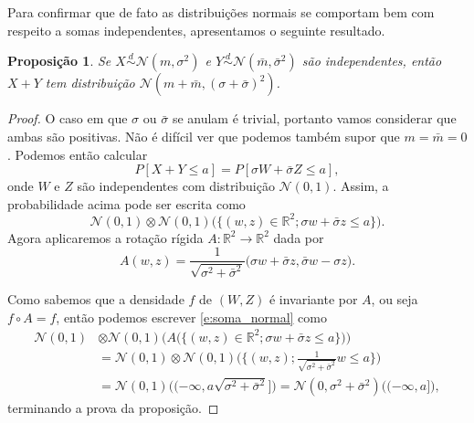 \documentclass[reqno]{article}
\newcommand*\1{\mathds{1}}
\newtheorem{proposition}[theorem]{Proposição}
\def \distr {\overset{d}{\sim}}
\begin{document}
Para confirmar que de fato as distribuições normais se comportam bem com respeito a somas independentes, apresentamos o seguinte resultado.

\begin{proposition}
  \label{p:soma_normais}
  Se $X \distr \mathcal{N}(m, \sigma^2)$ e $Y \distr \mathcal{N}(\bar{m}, \bar{\sigma}^2)$ são independentes, então $X + Y$ tem distribuição $\mathcal{N}(m + \bar{m}, (\sigma + \bar{\sigma})^2)$.
\end{proposition}

\begin{proof}
  O caso em que $\sigma$ ou $\bar{\sigma}$ se anulam é trivial, portanto vamos considerar que ambas são positivas.
  Não é difícil ver que podemos também supor que $m = \bar{m} = 0$.
  Podemos então calcular
  \begin{equation}
    P[X + Y \leq a] = P[\sigma W + \bar{\sigma} Z \leq a],
  \end{equation}
  onde $W$ e $Z$ são independentes com distribuição $\mathcal{N}(0,1)$.
  Assim, a probabilidade acima pode ser escrita como
  \begin{equation}
    \label{e:soma_normal}
    \mathcal{N}(0,1) \otimes \mathcal{N}(0,1) \Big( \big\{ (w,z) \in \mathbb{R}^2; \sigma w + \bar{\sigma} z \leq a \big\} \Big).
  \end{equation}
  Agora aplicaremos a rotação rígida $A: \mathbb{R}^2 \to \mathbb{R}^2$ dada por
  \begin{equation}
    A(w,z) = \frac{1}{\sqrt{\sigma^2 + \bar{\sigma}^2}} \big( \sigma w + \bar{\sigma} z, \bar{\sigma} w - \sigma z \big).
  \end{equation}

  Como sabemos que a densidade $f$ de $(W,Z)$ é invariante por $A$, ou seja $f \circ A = f$, então podemos escrever \eqref{e:soma_normal} como
  \begin{equation*}
    \begin{split}
      \mathcal{N}(0,1) & \otimes \mathcal{N}(0,1) \Big( A \big(\big\{ (w,z) \in \mathbb{R}^2; \sigma w + \bar{\sigma} z \leq a \big\} \big) \Big)\\
      & = \mathcal{N}(0,1) \otimes \mathcal{N}(0,1) \Big( \Big\{(w,z); \frac{1}{\sqrt{\sigma^2 + \bar{\sigma}^2}}w \leq a \Big\} \Big)\\
      & = \mathcal{N}(0,1) \big( (-\infty, a \sqrt{\sigma^2 + \bar{\sigma}^2} \big] \big) = \mathcal{N}(0,\sigma^2 + \bar{\sigma}^2) \big( (-\infty, a \big] \big),
    \end{split}
  \end{equation*}
  terminando a prova da proposição.
\end{proof}
\end{document}
